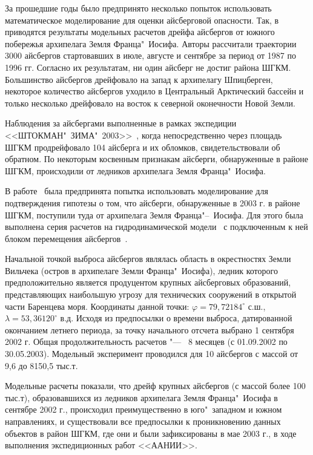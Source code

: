 За прошедшие годы было предпринято несколько попыток использовать математическое моделирование для оценки айсберговой опасности. Так, в~\cite{johannessen1999simulation} приводятся результаты модельных расчетов дрейфа айсбергов от южного побережья архипелага Земля Франца"~Иосифа. Авторы рассчитали траектории 3000 айсбергов стартовавших в июле, августе и сентябре за период от 1987 по 1996 гг. Согласно их результатам, ни один айсберг не достиг района ШГКМ. Большинство айсбергов дрейфовало на запад к архипелагу Шпицберген, некоторое количество айсбергов уходило в Центральный Арктический бассейн и только несколько дрейфовало на восток к северной оконечности Новой Земли.

Наблюдения за айсбергами выполненные в рамках экспедиции <<ШТОКМАН"~ЗИМА"~2003>>~\cite{Naumov2003}, когда непосредственно через площадь ШГКМ продрейфовало 104 айсберга и их обломков, свидетельствовали об обратном. По некоторым косвенным признакам айсберги, обнаруженные в районе ШГКМ, происходили от ледников архипелага Земля Франца"~Иосифа. 

В работе~\cite{Buzin2008} была предпринята попытка использовать моделирование для подтверждения гипотезы о том, что айсберги, обнаруженные в 2003 г. в районе ШГКМ, поступили туда от архипелага Земля Франца"--~Иосифа. Для этого была выполнена серия расчетов на гидродинамической модели~\cite{polyakov1998coupled} с подключенным к ней блоком перемещения айсбергов~\cite{Dmitriev1995}.

Начальной точкой выброса айсбергов являлась область в окрестностях Земли Вильчека (остров в архипелаге Земли Франца"~Иосифа), ледник которого предположительно является продуцентом крупных айсберговых образований, представляющих наибольшую угрозу для технических сооружений в открытой части Баренцева моря. Координаты данной точки: $\varphi=79,72184^\circ$ с.ш., $\lambda=53,36120^\circ$ в.д. Исходя из предпосылки о времени выброса, датированной окончанием летнего периода, за точку начального отсчета выбрано 1 сентября 2002 г. Общая продолжительность расчетов "---~ 8 месяцев (с 01.09.2002 по 30.05.2003). Модельный эксперимент проводился для 10 айсбергов с массой от 9,6 до 8150,5  тыс.\:т.

Модельные расчеты показали, что дрейф крупных айсбергов (с массой более 100 тыс.\:т), образовавшихся из ледников архипелага Земля Франца"~Иосифа в сентябре 2002 г., происходил преимущественно в юго"~западном и южном направлениях, и существовали все предпосылки к проникновению данных объектов в район ШГКМ, где они и были зафиксированы в мае 2003 г., в ходе выполнения экспедиционных работ <<ААНИИ>>.

